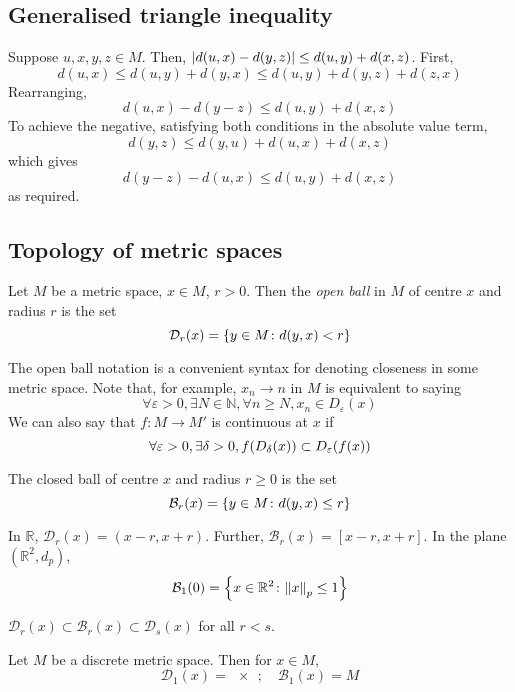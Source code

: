 \subsection{Generalised triangle inequality}
Suppose \( u,x,y,z \in M \).
Then, \( \abs{d(u,x) - d(y,z)} \leq d(u,y) + d(x,z) \).
First,
\[
	d(u,x) \leq d(u,y) + d(y,x) \leq d(u,y) + d(y,z) + d(z,x)
\]
Rearranging,
\[
	d(u,x)-d(y-z) \leq d(u,y) + d(x,z)
\]
To achieve the negative, satisfying both conditions in the absolute value term,
\[
	d(y,z) \leq d(y,u) + d(u,x) + d(x,z)
\]
which gives
\[
	d(y-z) - d(u,x) \leq d(u,y) + d(x,z)
\]
as required.

\subsection{Topology of metric spaces}
\begin{definition}
	Let \( M \) be a metric space, \( x \in M \), \( r > 0 \).
	Then the \textit{open ball} in \( M \) of centre \( x \) and radius \( r \) is the set
	\[
		\mathcal D_r(x) = \qty{y \in M \colon d(y,x) < r}
	\]
\end{definition}
The open ball notation is a convenient syntax for denoting closeness in some metric space.
Note that, for example, \( x_n \to n \) in \( M \) is equivalent to saying
\[
	\forall \varepsilon > 0, \exists N \in \mathbb N, \forall n \geq N, x_n \in D_\varepsilon(x)
\]
We can also say that \( f \colon M \to M' \) is continuous at \( x \) if
\[
	\forall \varepsilon > 0, \exists \delta > 0, f\qty(D_\delta(x)) \subset D_\varepsilon(f(x))
\]
\begin{definition}
	The closed ball of centre \( x \) and radius \( r \geq 0 \) is the set
	\[
		\mathcal B_r(x) = \qty{y \in M \colon d(y,x) \leq r}
	\]
\end{definition}
\begin{example}
	In \( \mathbb R \), \( \mathcal D_r(x) = (x-r,x+r) \).
	Further, \( \mathcal B_r(x) = [x-r,x+r] \).
	In the plane \( (\mathbb R^2, d_p) \),
	\[
		\mathcal B_1(0) = \qty{ x \in \mathbb R^2 \colon \norm{x}_p \leq 1 }
	\]
\end{example}
\begin{note}
	\( \mathcal D_r(x) \subset \mathcal B_r(x) \subset \mathcal D_s(x) \) for all \( r < s \).
\end{note}
\begin{example}
	Let \( M \) be a discrete metric space.
	Then for \( x \in M \),
	\[
		\mathcal D_1(x) = \qty{x};\quad \mathcal B_1(x) = M
	\]
\end{example}

